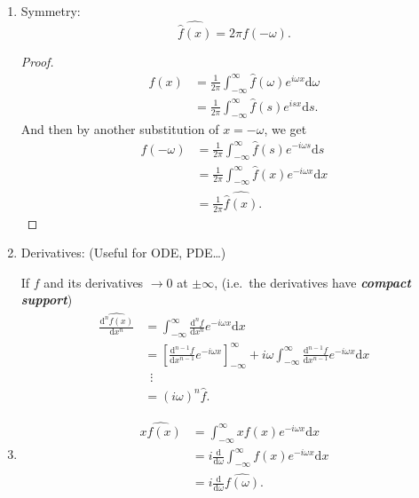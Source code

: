 \documentclass[12pt]{report}
\theoremstyle{definition}
\begin{document}
\begin{enumerate}[label = (\roman*)]
    \item Symmetry:
        \[
            \widehat{\hat{f}(x)} = 2\pi f(-\omega).
        \]
        \begin{proof}
            \[
                \begin{align*}
                    f(x)
                    & = \frac{1}{2\pi}\int_{-\infty}^{\infty} \hat{f}(\omega)e^{i\omega x}\mathrm{d}\omega \\
                    & = \frac{1}{2\pi}\int_{-\infty}^{\infty} \hat{f}(s)e^{isx}\mathrm{d}s.
                \end{align*} 
            \]And then by another substitution of $x = -\omega$, we get\[
                \begin{align*}
                    f(-\omega)
                    & = \frac{1}{2\pi} \int_{-\infty}^{\infty} \hat{f}(s)e^{-i\omega s}\mathrm{d}s \\
                    & = \frac{1}{2\pi}\int_{-\infty}^{\infty} \hat{f}(x)e^{-i\omega x}\mathrm{d}x \\
                    & = \frac{1}{2\pi}\widehat{\hat{f}(x)}.
                \end{align*} 
            \]
        \end{proof} 

    \item Derivatives: (Useful for ODE, PDE\ldots)

        If $f$ and its derivatives $\rightarrow{}0$ at $\pm\infty$,
        (i.e.\ the derivatives have \textbf{\emph{compact support}})
        \begin{align*}
            \widehat{\frac{\mathrm{d}^{n}f(x)}{\mathrm{d}x^{n}}}
            & = \int_{-\infty}^{\infty} \frac{\mathrm{d}^{n}f}{\mathrm{d}x^{n}}e^{-i\omega x}\mathrm{d}x \\
            & = {\left[\frac{\mathrm{d}^{n-1}f}{\mathrm{d}x^{n-1}}e^{-i\omega x}\right]}_{-\infty}^{\infty}
            + i\omega \int_{-\infty}^{\infty} \frac{\mathrm{d}^{n-1}f}{\mathrm{d}x^{n-1}}e^{-i\omega x}\mathrm{d}x \\
            & \;\:\vdots \\
            & = {(i\omega)}^{n}\hat{f}.
        \end{align*} 

    \item 
        \begin{align*}
            \widehat{xf(x)}
            & = \int_{-\infty}^{\infty} xf(x)e^{-i\omega x}\mathrm{d}x \\
            & = i \frac{\mathrm{d}}{\mathrm{d}\omega} \int_{-\infty}^{\infty} f(x)e^{-i\omega x}\mathrm{d}x \\
            & = i\frac{\mathrm{d}}{\mathrm{d}\omega}\widehat{f(\omega)}.
        \end{align*} 


\end{enumerate}
\end{document}
